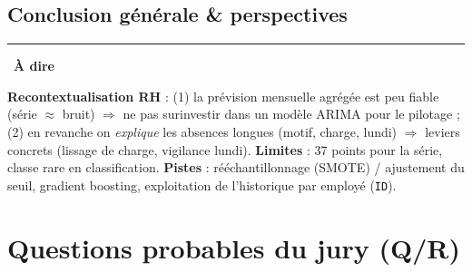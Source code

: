 \documentclass[11pt,a4paper]{article}
\newcommand{\code}[1]{\texttt{#1}}
\newenvironment{say}{\par\medskip\noindent\textcolor{blue!45!black}{\rule[-1pt]{3pt}{12pt}}\
  \textbf{\textcolor{blue!45!black}{À dire}}\par\nopagebreak\smallskip\noindent\ignorespaces}{\par\medskip}
\begin{document}
\subsection{Conclusion générale \& perspectives}
\begin{say}
\textbf{Recontextualisation RH} : (1) la prévision mensuelle agrégée est peu fiable (série $\approx$
bruit) $\Rightarrow$ ne pas surinvestir dans un modèle ARIMA pour le pilotage ; (2) en revanche on
\emph{explique} les absences longues (motif, charge, lundi) $\Rightarrow$ leviers concrets
(lissage de charge, vigilance lundi). \textbf{Limites} : 37 points pour la série, classe rare en
classification. \textbf{Pistes} : rééchantillonnage (SMOTE) / ajustement du seuil, gradient
boosting, exploitation de l'historique par employé (\code{ID}).
\end{say}

\section{Questions probables du jury (Q/R)}
\end{document}
